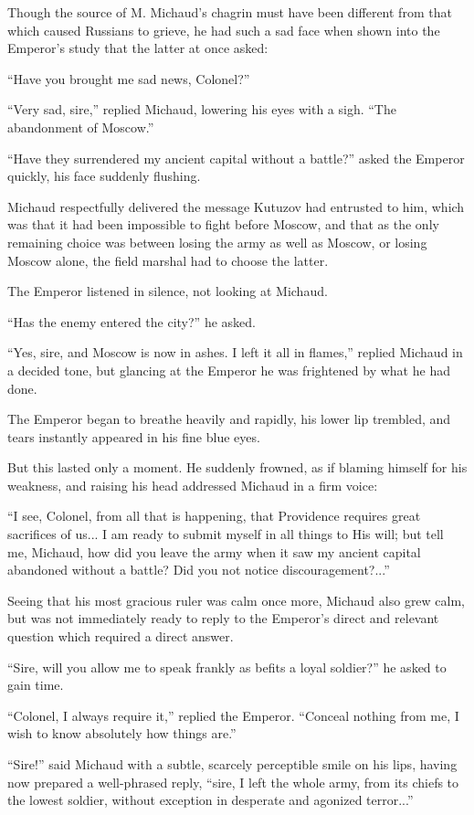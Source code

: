 Though the source of M. Michaud's chagrin must have been
different from that which caused Russians to grieve, he had such
a sad face when shown into the Emperor's study that the latter at
once asked:

``Have you brought me sad news, Colonel?''

``Very sad, sire,'' replied Michaud, lowering his eyes with a
sigh. ``The abandonment of Moscow.''

``Have they surrendered my ancient capital without a battle?''
asked the Emperor quickly, his face suddenly flushing.

Michaud respectfully delivered the message Kutuzov had entrusted
to him, which was that it had been impossible to fight before
Moscow, and that as the only remaining choice was between losing
the army as well as Moscow, or losing Moscow alone, the field
marshal had to choose the latter.

The Emperor listened in silence, not looking at Michaud.

``Has the enemy entered the city?'' he asked.

``Yes, sire, and Moscow is now in ashes. I left it all in
flames,'' replied Michaud in a decided tone, but glancing at the
Emperor he was frightened by what he had done.

The Emperor began to breathe heavily and rapidly, his lower lip
trembled, and tears instantly appeared in his fine blue eyes.

But this lasted only a moment. He suddenly frowned, as if blaming
himself for his weakness, and raising his head addressed Michaud
in a firm voice:

``I see, Colonel, from all that is happening, that Providence
requires great sacrifices of us... I am ready to submit myself in
all things to His will; but tell me, Michaud, how did you leave
the army when it saw my ancient capital abandoned without a
battle? Did you not notice discouragement?...''

Seeing that his most gracious ruler was calm once more, Michaud
also grew calm, but was not immediately ready to reply to the
Emperor's direct and relevant question which required a direct
answer.

``Sire, will you allow me to speak frankly as befits a loyal
soldier?'' he asked to gain time.

``Colonel, I always require it,'' replied the Emperor. ``Conceal
nothing from me, I wish to know absolutely how things are.''

``Sire!'' said Michaud with a subtle, scarcely perceptible smile
on his lips, having now prepared a well-phrased reply, ``sire, I
left the whole army, from its chiefs to the lowest soldier,
without exception in desperate and agonized terror...''

